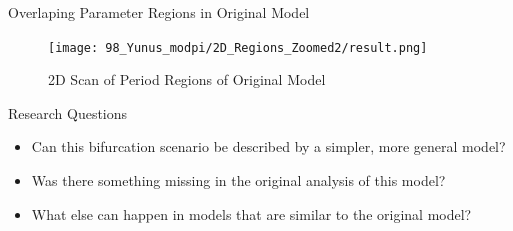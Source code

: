 
\begin{frame}{Overlaping Parameter Regions in Original Model}
    \begin{figure}
        \centering
        \texttt{[image: 98\_Yunus\_modpi/2D\_Regions\_Zoomed2/result.png]}
        \caption{2D Scan of Period Regions of Original Model}
    \end{figure}
\end{frame}

\begin{frame}{Research Questions}
    \begin{itemize}
        \item Can this bifurcation scenario be described by a simpler, more general model?
        \item Was there something missing in the original analysis of this model?
        \item What else can happen in models that are similar to the original model?
    \end{itemize}
\end{frame}
